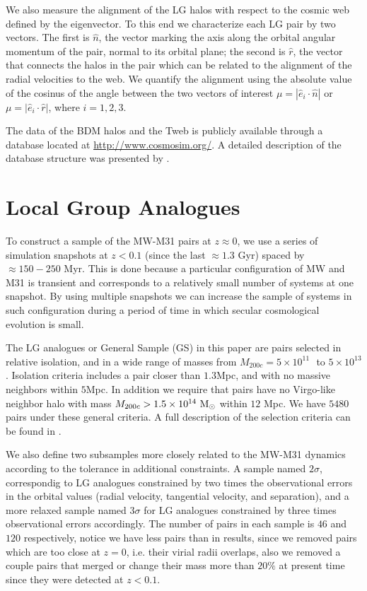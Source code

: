 \documentclass{emulateapj}
\newcommand{\mpc}{\rm{Mpc}}
\newcommand{\msun}{{\ifmmode{{\rm {M_{\odot}}}}\else{${\rm{M_{\odot}}}$}\fi}}
\begin{document}
We also measure the alignment of the LG halos with respect to the
cosmic web defined by the eigenvector.
To this end we characterize each LG pair by two vectors. 
The first is $\hat{n}$, the vector marking the axis along the orbital angular
momentum of the pair, normal to its orbital plane; the second is
$\hat{r}$, the vector that connects the halos in the pair which can be
related to the alignment of the radial velocities to the web.
We quantify the alignment using the absolute value of the cosinus of
the angle between the two vectors of interest $\mu=|\hat{e}_i \cdot
\hat{n}|$ or $\mu=|\hat{e}_i\cdot \hat{r}|$, where $i=1,2,3$. 


The data of the BDM halos and the Tweb is publicly available through
a database located at \url{http://www.cosmosim.org/}. A detailed
description of the database structure was presented by \cite{Riebe2013}.

\section{Local Group Analogues}
\label{sec:lg_analogues}

To construct a sample of the MW-M31 pairs at $z\approx 0$, we use a
series of simulation snapshots  at $z<0.1$ (since the last $\approx
1.3$ Gyr) spaced by $\approx 150-250$ Myr. 
This is done because a particular configuration of MW and M31 is transient and
corresponds to a relatively small number of systems at one
snapshot. 
By using multiple snapshots we can increase the sample of systems in
such configuration during a period of time in which secular
cosmological evolution is small.  

The LG analogues or General Sample (GS) in this paper are pairs selected in
relative isolation, and in a wide range of masses from  $M_{200c}=5
\times 10^{11}$ \msun $ $ to $ 5 \times 10^{13}$ \msun.  
Isolation criteria includes a pair closer than $1.3$\mpc, and with no
massive neighbors within $5$\mpc.
In addition we require that pairs have no Virgo-like neighbor halo
with mass $M_{200c}>1.5 \times 10^{14}\ \rm M_{\odot}$ within $12$
Mpc.  
We have $5480$ pairs under these general criteria. 
A full description of the selection criteria can be found in
\citet{lganalogues,sat}.   

We also define two subsamples more closely related to the MW-M31 
dynamics according to the tolerance in additional constraints.
A sample named $2\sigma$, correspondig to LG analogues constrained by
two times the observational errors in the orbital values (radial
velocity, tangential velocity, and separation), and a more relaxed
sample named $3\sigma$ for LG analogues constrained by three times
observational errors accordingly. 
The number of pairs in each sample is $46$ and $120$ respectively,
notice we have less pairs than in \citet{lganalogues} results, since
we removed pairs which are too close at $z=0$, i.e. their virial radii
overlaps, also we removed a couple pairs that merged or change their
mass more than $20\%$ at present time since they were detected at
$z<0.1$. 
\end{document}
